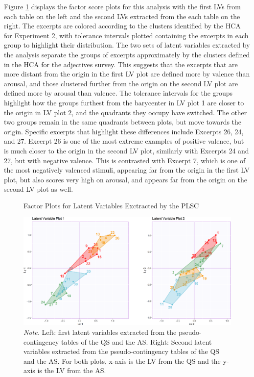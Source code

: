 \documentclass[
  english,
  man,floatsintext]{apa6}
\begin{document}
Figure \ref{fig:factorplotsPLSC} displays the factor score plots for this analysis with the first LVs from each table on the left and the second LVs extracted from the each table on the right. The excerpts are colored according to the clusters identified by the HCA for Experiment 2, with tolerance intervals plotted containing the excerpts in each group to highlight their distribution. The two sets of latent variables extracted by the analysis separate the groups of excerpts approximately by the clusters defined in the HCA for the adjectives survey. This suggests that the excerpts that are more distant from the origin in the first LV plot are defined more by valence than arousal, and those clustered further from the origin on the second LV plot are defined more by arousal than valence. The tolerance intervals for the groups highlight how the groups furthest from the barycenter in LV plot 1 are closer to the origin in LV plot 2, and the quadrants they occupy have switched. The other two groups remain in the same quadrants between plots, but move towards the origin.
Specific excerpts that highlight these differences include Excerpts 26, 24, and 27. Excerpt 26 is one of the most extreme examples of positive valence, but is much closer to the origin in the second LV plot, similarly with Excerpts 24 and 27, but with negative valence. This is contrasted with Excerpt 7, which is one of the most negatively valenced stimuli, appearing far from the origin in the first LV plot, but also scores very high on arousal, and appears far from the origin on the second LV plot as well.

\begin{figure}   
  \centering  
  \caption{Factor Plots for Latent Variables Exctracted by the PLSC}
  \label{fig:factorplotsPLSC}
    \includegraphics{./Music-Descriptor-Space_files/figure-latex/factorplotsPLSC-1.png}
  \caption*{\footnotesize \textit{Note.} Left: first latent variables extracted from the pseudo-contingency tables of the QS and the AS. Right: Second latent variables extracted from the pseudo-contingency tables of the QS and the AS. For both plots, x-axis is the LV from the QS and the y-axis is the LV from the AS.}
\end{figure}
\end{document}
